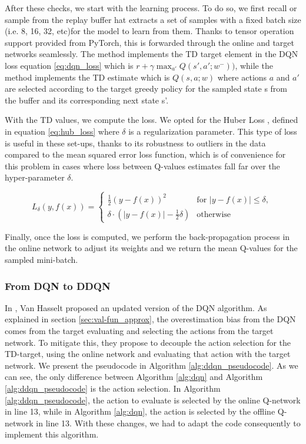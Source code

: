 After these checks, we start with the learning process. To do so, we first recall or sample from the replay buffer hat extracts a set of samples with a fixed batch size (i.e. 8, 16, 32, etc)for the model to learn from them. Thanks to tensor operation support provided from PyTorch, this is forwarded through the online and target networks seamlessly. The  method implements the TD target element in the DQN loss equation \ref{eq:dqn_loss} which is $r + \gamma \max_{a'} Q(s', a'; w^-))$, while the method  implements the TD estimate which is $Q(s, a; w)$ where actions $a$ and $a'$ are selected according to the target greedy policy for the sampled state s from the buffer and its corresponding next state s'.

With the TD values, we compute the loss. We opted for the Huber Loss \cite{9918637}, defined in equation \ref{eq:hub_loss} where $\delta$ is a regularization parameter. This type of loss is useful in these set-ups, thanks to its robustness to outliers in the data compared to the mean squared error loss function, which is of convenience for this problem in cases where loss between Q-values estimates fall far over the hyper-parameter $\delta$.

\begin{equation}
	\label{eq:hub_loss}
	L_{\delta}(y, f(x)) = 
	\begin{cases} 
		\frac{1}{2}(y-f(x))^2 & \text{for $|y-f(x)| \leq \delta$, } \\
		\delta \cdot \left(|y-f(x)| - \frac{1}{2}\delta \right) & \text{otherwise}
	\end{cases}
\end{equation}

Finally, once the loss is computed, we perform the back-propagation process in the online network to adjust its weights and we return the mean Q-values for the sampled mini-batch.

\subsubsection{From DQN to DDQN}
\label{sec:ddqn_training_loop}
In \cite{vanhasselt2015deep}, Van Hasselt  proposed an updated version of the DQN algorithm. As explained in section \ref{sec:val-fun_approx}, the overestimation bias from the DQN comes from the target evaluating and selecting the actions from the target network. To mitigate this, they propose to decouple the action selection for the TD-target, using the online network and evaluating that action with the target network. We present the pseudocode in Algorithm \ref{alg:ddqn_pseudocode}. As we can see, the only difference between Algorithm \ref{alg:dqn} and Algorithm \ref{alg:ddqn_pseudocode} is the action selection. In Algorithm \ref{alg:ddqn_pseudocode}, the action to evaluate is selected by the online Q-network in line 13, while in Algorithm \ref{alg:dqn}, the action is selected by the offline Q-network in line 13. With these changes, we had to adapt the code consequently to implement this algorithm.

